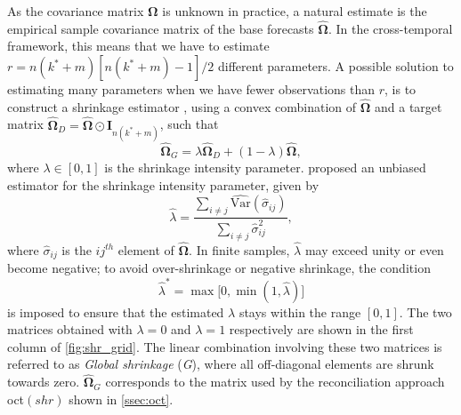 \documentclass[a4paper,11pt]{article}
\newcommand{\Ivet}{\bm{I}}
\newcommand{\Omegavet}{\bm{\Omega}}
\theoremstyle{definition}
\begin{document}
As the covariance matrix $\Omegavet$ is unknown in practice, a natural estimate is the empirical sample covariance matrix of the base forecasts $\widehat{\Omegavet}$. In the cross-temporal framework, this means that we have to estimate $r = n(k^\ast+m)[n(k^\ast+m)-1]/2$ different parameters. A possible solution to estimating many parameters when we have fewer observations than $r$, is to construct a shrinkage estimator \citep{efron1975a,efron1975,efron1977}, using a convex combination of $\widehat{\Omegavet}$ and a target matrix $\widehat{\Omegavet}_D = \widehat{\Omegavet} \odot \Ivet_{n(k^\ast+m)}$, such that
\begin{equation}\label{eq:global}
	\widehat{\Omegavet}_{G} = \lambda \widehat{\Omegavet}_D + (1-\lambda) \widehat{\Omegavet},
\end{equation}
where $\lambda \in [0,1]$ is the shrinkage intensity parameter.
\cite{schafer2005} proposed an unbiased estimator for the shrinkage intensity parameter, given by
$$
	\widehat{\lambda}=\frac{\sum_{i \neq j} \widehat{\mathrm{Var}}(\widehat{\sigma}_{i j})}{\sum_{i \neq j} \widehat{\sigma}_{i j}^2},
$$
where $\widehat{\sigma}_{i j}$ is the $i j^{th}$ element of $\widehat{\Omegavet}$. In finite samples, $\widehat{\lambda}$ may exceed unity or even become negative; to avoid over-shrinkage or negative shrinkage, the condition
$$
	\widehat{\lambda}^\ast=\max \big[0, \min (1, \widehat{\lambda})\big]
$$
is imposed to ensure that the estimated $\lambda$ stays within the range $[0,1]$. The two matrices obtained with $\lambda=0$ and $\lambda=1$ respectively are shown in the first column of \autoref{fig:shr_grid}. The linear combination involving these two matrices is referred to as \textit{Global shrinkage} (\textit{G}), where all off-diagonal elements are shrunk towards zero. $\widehat{\Omegavet}_{G}$ corresponds to the matrix used by the reconciliation approach oct$(shr)$ shown in \autoref{ssec:oct}.
\end{document}
